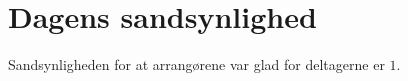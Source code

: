 \begin{minipage}[t]{100mm}
\section*{Dagens sandsynlighed}
Sandsynligheden for at arrangørene var glad for deltagerne er $1$.

\end{minipage}

